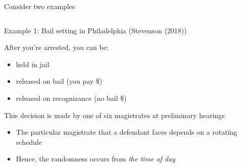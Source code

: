 \documentclass[notes,11pt, aspectratio=169]{beamer}
\newenvironment{wideitemize}{\itemize\addtolength{\itemsep}{10pt}}{\enditemize}
\begin{document}
\begin{frame}{Consider two examples}
  \begin{columns}[onlytextwidth, T] %
    \begin{column}{.50\textwidth}
      \begin{wideitemize}
      \item Example 1: Bail setting in Philadelphia (Stevenson (2018))
      \item After you're arrested, you can be:
        \begin{itemize}
        \item held in jail
        \item released on bail (you pay \$)
        \item released on recognizance (no bail \$)
        \end{itemize}
      \item This decision is made by one of six magistrates at
        preliminary hearings
        \begin{itemize}
        \item The particular magistrate that a defendant faces
          depends on a rotating schedule
        \item Hence, the randomness occurs from \emph{the time of
            day}
        \end{itemize}
      \end{wideitemize}
    \end{column}%
    \hfill%
    \begin{column}{.5\textwidth}

\end{column}
\end{columns}
\end{frame}
\end{document}
